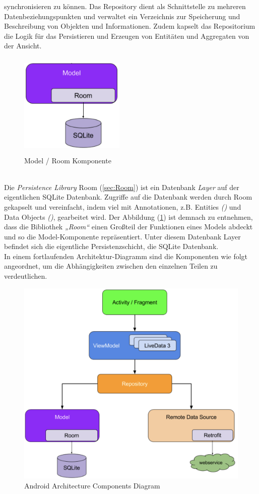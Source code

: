 synchronisieren zu können. Das Repository dient als Schnittstelle zu mehreren Datenbeziehungspunkten und verwaltet ein Verzeichnis zur 
Speicherung und Beschreibung von Objekten und Informationen. Zudem kapselt das Repositorium die Logik für das Persistieren und Erzeugen von 
Entitäten und Aggregaten von der Ansicht. 
\begin{figure}[hbt!]
    \centering
    \includegraphics[width=5cm,height=5cm,keepaspectratio]{2GrundlagenX/Bilder/roomComp.png}
    \caption{Model / Room Komponente \cite{aac.2020j}}
    \label{pic:roomComp}
\end{figure} 
\pagebreak
\\ 
Die \textit{Persistence Library} Room (\ref{sec:Room}) ist ein Datenbank \textit{Layer} auf der eigentlichen SQLite Datenbank. Zugriffe auf 
die Datenbank werden durch Room gekapselt und vereinfacht, indem viel mit Annotationen, z.B. Entities \textit{(\@Entity)} und Data Objects 
\textit{(\@Dao)}, gearbeitet wird. Der Abbildung (\ref{pic:roomComp}) ist demnach zu entnehmen, dass die Bibliothek \textit{„Room“} einen Großteil der 
Funktionen eines Models abdeckt und so die Model-Komponente repräsentiert. Unter diesem Datenbank Layer befindet sich die eigentliche 
Persistenzschicht, die SQLite Datenbank.  
\\ 
\linebreak 
In einem fortlaufenden Architektur-Diagramm sind die Komponenten wie folgt angeordnet, um die Abhängigkeiten zwischen den einzelnen Teilen 
zu verdeutlichen. 
\begin{figure}[hbt!]
    \centering
    \includegraphics[width=12cm,height=10cm,keepaspectratio]{2GrundlagenX/Bilder/aac.png}
    \caption{Android Architecture Components Diagram\cite{aac.2020j}}
    \label{pic:aacDia}
\end{figure} 
